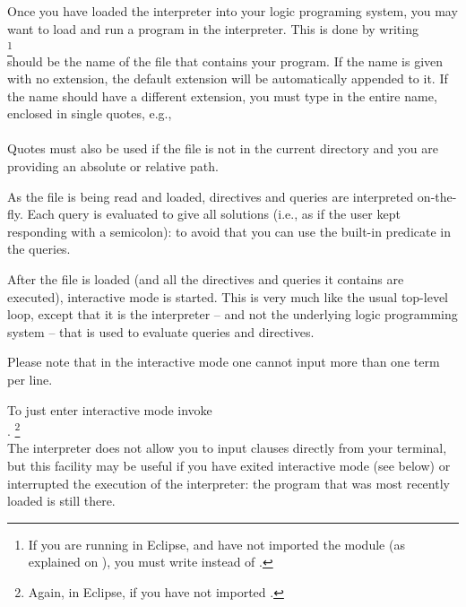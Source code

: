 


Once you have loaded the interpreter into your logic programing system, you
may want to load and run a program in the interpreter. This is done by
writing\\
\ind{}%
\footnote{
  If you are running in Eclipse, and have not imported the module 
  (as explained on ), you must write 
  instead of .
}\\
 should be the name of the file that contains your program.
If the name is given with no extension, the default extension
 will be automatically appended to it.%
%
If the name should have a different extension, you must type in the entire
name, enclosed in single quotes, e.g.,\\
\ind{}\\
Quotes must also be used if the file is not in the current directory and you
are providing an absolute or relative path.

As the file is being read and loaded, directives and queries are interpreted
on-the-fly. Each query is evaluated to give all solutions (i.e., as if the
user kept responding with a semicolon): to avoid that you can use the
built-in predicate  in the queries.



After the file is loaded (and all the directives and queries it contains are
executed), interactive mode is started.  This is very much like the usual
top-level loop, except that it is the interpreter -- and not the
underlying logic programming system -- that is used to evaluate queries and
directives.

Please note that in the interactive mode one cannot input more than one term
per line.

To just enter interactive mode invoke\\
\ind{}.%
\footnote{Again,  in Eclipse, if you have not imported
  .}\\
 The interpreter does not allow you to input clauses directly from your
 terminal, but this facility may be useful if you have exited interactive
 mode (see below) or interrupted the execution of the interpreter: the
 program that was most recently loaded is still there.

